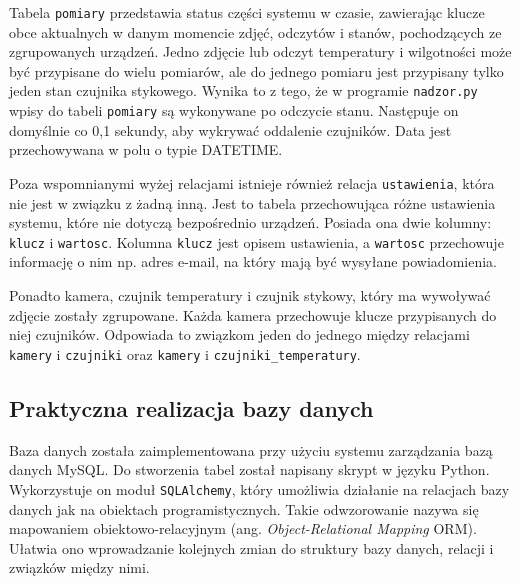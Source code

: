 \documentclass[a4paper,12pt,twoside]{article}
\begin{document}
Tabela \texttt{pomiary} przedstawia status części systemu w czasie, zawierając klucze obce aktualnych w danym momencie zdjęć, odczytów i stanów, pochodzących ze zgrupowanych urządzeń. Jedno zdjęcie lub odczyt temperatury i wilgotności może być przypisane do wielu pomiarów, ale do jednego pomiaru jest przypisany tylko jeden stan czujnika stykowego. Wynika to z tego, że w programie \texttt{nadzor.py} wpisy do tabeli \texttt{pomiary} są wykonywane po odczycie stanu. Następuje on domyślnie co 0,1 sekundy, aby wykrywać oddalenie czujników. Data jest przechowywana w polu o typie DATETIME. 
 
Poza wspomnianymi wyżej relacjami istnieje również relacja \texttt{ustawienia}, która nie jest w związku z żadną inną. Jest to tabela przechowująca różne ustawienia systemu, które nie dotyczą bezpośrednio urządzeń. Posiada ona dwie kolumny: \texttt{klucz} i \texttt{wartosc}. Kolumna \texttt{klucz} jest opisem ustawienia, a \texttt{wartosc} przechowuje informację o nim np. adres e-mail, na który mają być wysyłane powiadomienia. 

Ponadto kamera, czujnik temperatury i czujnik stykowy, który ma wywoływać zdjęcie zostały zgrupowane. Każda kamera przechowuje klucze przypisanych do niej czujników. Odpowiada to związkom jeden do jednego między relacjami \texttt{kamery} i \texttt{czujniki} oraz \texttt{kamery} i \texttt{czujniki{\_}temperatury}.

\subsection{Praktyczna realizacja bazy danych}
Baza danych została zaimplementowana przy użyciu systemu zarządzania bazą danych MySQL. Do stworzenia tabel został napisany skrypt w języku Python. Wykorzystuje on moduł \texttt{SQLAlchemy}, który umożliwia działanie na relacjach bazy danych jak na obiektach programistycznych. Takie odwzorowanie nazywa się mapowaniem obiektowo-relacyjnym (ang. \textit{Object-Relational Mapping} ORM). Ułatwia ono wprowadzanie kolejnych zmian do struktury bazy danych, relacji i związków między nimi.
\end{document}
